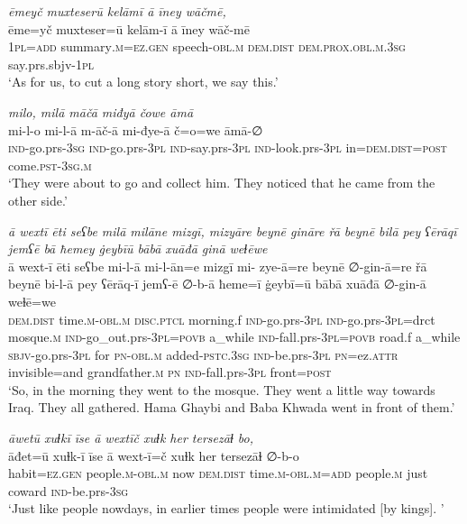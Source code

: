 \ea \label{BP.63}
\textit{ēmeyč muxteserū kelāmī ā īney wāčmē,} \\ 
\gll ēme=yč muxteser=ū kelām-ī ā īney wāč-mē \\ 
 \textsc{1pl}\textsc{=add} summary\textsc{.m}\textsc{=ez.gen} speech\textsc{-obl}\textsc{.m} \textsc{dem.dist} \textsc{dem.prox}\textsc{.obl}\textsc{.m}\textsc{.3sg} say.prs.sbjv\textsc{-\textsc{1pl}} \\ 
\glt `As for us, to cut a long story short, we say this.'
\z 
 
\ea \label{BP.80}
\textit{milo, milā māčā miđyā čowe āmā} \\ 
\gll mi-l-o mi-l-ā m-āč-ā mi-đye-ā č=o=we āmā-∅ \\ 
 \textsc{ind-}go.prs\textsc{-3sg} \textsc{ind-}go.prs\textsc{-3pl} \textsc{ind-}say.prs\textsc{-3pl} \textsc{ind-}look.prs\textsc{-3pl} in=\textsc{dem.dist}\textsc{=\textsc{post}} come\textsc{.pst}\textsc{-3sg}\textsc{.m} \\ 
\glt `They were about to go and collect him. They noticed that he came from the other side.'
\z 
 
\ea \label{BP.98}
\textit{ā wextī ēti seʕbe milā milāne mizgī, mizyāre beynē gināre řā beynē bilā pey ʕērāqī jemʕē bā ħemey ġeybīū bābā xuāđā ginā weɫēwe} \\ 
\gll ā wext-ī ēti seʕbe mi-l-ā mi-l-ān=e mizgī mi- zye-ā=re beynē ∅-gin-ā=re řā beynē bi-l-ā pey ʕērāq-ī jemʕ-ē ∅-b-ā ħeme=ī ġeybī=ū bābā xuāđā ∅-gin-ā weɫē=we \\ 
 \textsc{dem.dist} time\textsc{.m}\textsc{-obl}\textsc{.m} \textsc{disc.ptcl} morning.f \textsc{ind-}go.prs\textsc{-3pl} \textsc{ind-}go.prs\textsc{-3pl}=drct mosque\textsc{.m} \textsc{ind-}go\_out.prs\textsc{-3pl}\textsc{=\textsc{povb}} a\_while \textsc{ind-}fall.prs\textsc{-3pl}\textsc{=\textsc{povb}} road.f a\_while \textsc{sbjv-}go.prs\textsc{-3pl} for \textsc{pn}\textsc{-obl}\textsc{.m} added\textsc{-pstc}\textsc{.3sg} \textsc{ind-}be.prs\textsc{-3pl} \textsc{pn}=ez.\textsc{attr} invisible=and grandfather\textsc{.m} \textsc{pn} \textsc{ind-}fall.prs\textsc{-3pl} front\textsc{=\textsc{post}} \\ 
\glt `So, in the morning they went to the mosque. They went a little way towards Iraq. They all gathered. Hama Ghaybi and Baba Khwada went in front of them.'
\z 
 
\ea \label{BP.100}
\textit{āwetū xuɫkī īse ā wextīč xuɫk her tersezāɫ bo,} \\ 
\gll āđet=ū xuɫk-ī īse ā wext-ī=č xuɫk her tersezāɫ ∅-b-o \\ 
 habit\textsc{=ez.gen} people\textsc{.m}\textsc{-obl}\textsc{.m} now \textsc{dem.dist} time\textsc{.m}\textsc{-obl}\textsc{.m}\textsc{=add} people\textsc{.m} just coward \textsc{ind-}be.prs\textsc{-3sg} \\ 
\glt `Just like people nowdays, in earlier times people were intimidated [by kings]. '
\z 
 
